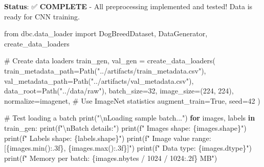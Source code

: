 \documentclass[
  letterpaper,
  DIV=11,
  numbers=noendperiod]{scrartcl}
\newenvironment{Shaded}{\begin{snugshade}}{\end{snugshade}}
\newcommand{\BuiltInTok}[1]{\textcolor[rgb]{0.00,0.23,0.31}{#1}}
\newcommand{\CharTok}[1]{\textcolor[rgb]{0.13,0.47,0.30}{#1}}
\newcommand{\CommentTok}[1]{\textcolor[rgb]{0.37,0.37,0.37}{#1}}
\newcommand{\ControlFlowTok}[1]{\textcolor[rgb]{0.00,0.23,0.31}{\textbf{#1}}}
\newcommand{\DecValTok}[1]{\textcolor[rgb]{0.68,0.00,0.00}{#1}}
\newcommand{\ImportTok}[1]{\textcolor[rgb]{0.00,0.46,0.62}{#1}}
\newcommand{\KeywordTok}[1]{\textcolor[rgb]{0.00,0.23,0.31}{\textbf{#1}}}
\newcommand{\NormalTok}[1]{\textcolor[rgb]{0.00,0.23,0.31}{#1}}
\newcommand{\OperatorTok}[1]{\textcolor[rgb]{0.37,0.37,0.37}{#1}}
\newcommand{\SpecialCharTok}[1]{\textcolor[rgb]{0.37,0.37,0.37}{#1}}
\newcommand{\SpecialStringTok}[1]{\textcolor[rgb]{0.13,0.47,0.30}{#1}}
\newcommand{\StringTok}[1]{\textcolor[rgb]{0.13,0.47,0.30}{#1}}
\newcommand{\VariableTok}[1]{\textcolor[rgb]{0.07,0.07,0.07}{#1}}
\renewenvironment{Shaded}{%
  \begin{tcolorbox}[%
    enhanced,%
    colback=codebg,%
    colframe=codebg,%
    borderline west={3pt}{0pt}{sectionblue},%
    boxrule=0pt,%
    arc=0pt,%
    boxsep=5pt,%
    left=2mm,%
    right=2mm,%
    top=2mm,%
    bottom=2mm%
  ]%
}{%
  \end{tcolorbox}%
}
\begin{document}
\textbf{Status}: ✅ \textbf{COMPLETE} - All preprocessing implemented
and tested! Data is ready for CNN training.

\begin{Shaded}
\begin{Highlighting}[]
\ImportTok{from}\NormalTok{ dbc.data\_loader }\ImportTok{import}\NormalTok{ DogBreedDataset, DataGenerator, create\_data\_loaders}

\CommentTok{\# Create data loaders}
\NormalTok{train\_gen, val\_gen }\OperatorTok{=}\NormalTok{ create\_data\_loaders(}
\NormalTok{    train\_metadata\_path}\OperatorTok{=}\NormalTok{Path(}\StringTok{"../artifacts/train\_metadata.csv"}\NormalTok{),}
\NormalTok{    val\_metadata\_path}\OperatorTok{=}\NormalTok{Path(}\StringTok{"../artifacts/val\_metadata.csv"}\NormalTok{),}
\NormalTok{    data\_root}\OperatorTok{=}\NormalTok{Path(}\StringTok{"../data/raw"}\NormalTok{),}
\NormalTok{    batch\_size}\OperatorTok{=}\DecValTok{32}\NormalTok{,}
\NormalTok{    image\_size}\OperatorTok{=}\NormalTok{(}\DecValTok{224}\NormalTok{, }\DecValTok{224}\NormalTok{),}
\NormalTok{    normalize}\OperatorTok{=}\StringTok{\textquotesingle{}imagenet\textquotesingle{}}\NormalTok{,  }\CommentTok{\# Use ImageNet statistics}
\NormalTok{    augment\_train}\OperatorTok{=}\VariableTok{True}\NormalTok{,}
\NormalTok{    seed}\OperatorTok{=}\DecValTok{42}
\NormalTok{)}

\CommentTok{\# Test loading a batch}
\BuiltInTok{print}\NormalTok{(}\StringTok{"}\CharTok{\textbackslash{}n}\StringTok{Loading sample batch..."}\NormalTok{)}
\ControlFlowTok{for}\NormalTok{ images, labels }\KeywordTok{in}\NormalTok{ train\_gen:}
    \BuiltInTok{print}\NormalTok{(}\SpecialStringTok{f"}\CharTok{\textbackslash{}n}\SpecialStringTok{Batch details:"}\NormalTok{)}
    \BuiltInTok{print}\NormalTok{(}\SpecialStringTok{f"  Images shape: }\SpecialCharTok{\{}\NormalTok{images}\SpecialCharTok{.}\NormalTok{shape}\SpecialCharTok{\}}\SpecialStringTok{"}\NormalTok{)}
    \BuiltInTok{print}\NormalTok{(}\SpecialStringTok{f"  Labels shape: }\SpecialCharTok{\{}\NormalTok{labels}\SpecialCharTok{.}\NormalTok{shape}\SpecialCharTok{\}}\SpecialStringTok{"}\NormalTok{)}
    \BuiltInTok{print}\NormalTok{(}\SpecialStringTok{f"  Image value range: [}\SpecialCharTok{\{}\NormalTok{images}\SpecialCharTok{.}\BuiltInTok{min}\NormalTok{()}\SpecialCharTok{:.3f\}}\SpecialStringTok{, }\SpecialCharTok{\{}\NormalTok{images}\SpecialCharTok{.}\BuiltInTok{max}\NormalTok{()}\SpecialCharTok{:.3f\}}\SpecialStringTok{]"}\NormalTok{)}
    \BuiltInTok{print}\NormalTok{(}\SpecialStringTok{f"  Data type: }\SpecialCharTok{\{}\NormalTok{images}\SpecialCharTok{.}\NormalTok{dtype}\SpecialCharTok{\}}\SpecialStringTok{"}\NormalTok{)}
    \BuiltInTok{print}\NormalTok{(}\SpecialStringTok{f"  Memory per batch: }\SpecialCharTok{\{}\NormalTok{images}\SpecialCharTok{.}\NormalTok{nbytes }\OperatorTok{/} \DecValTok{1024} \OperatorTok{/} \DecValTok{1024}\SpecialCharTok{:.2f\}}\SpecialStringTok{ MB"}\NormalTok{)}
    

\end{Highlighting}
\end{Shaded}
\end{document}
